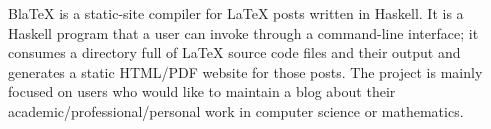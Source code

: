 BlaTeX is a static-site compiler for LaTeX posts written in Haskell. It is a Haskell program that a user can invoke through a command-line interface; it consumes a directory full of LaTeX source code files and their output and generates a static HTML/PDF website for those posts. The project is mainly focused on users who would like to maintain a blog about their academic/professional/personal work in computer science or mathematics. 